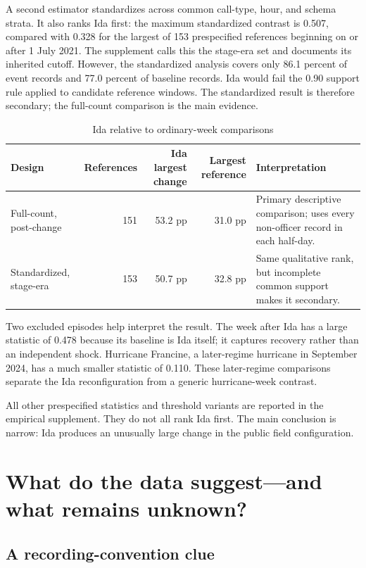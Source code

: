 \documentclass[11pt]{article}
\begin{document}
A second estimator standardizes across common call-type, hour, and schema strata. It also ranks Ida first: the maximum standardized contrast is 0.507, compared with 0.328 for the largest of 153 prespecified references beginning on or after 1 July 2021. The supplement calls this the stage-era set and documents its inherited cutoff. However, the standardized analysis covers only 86.1 percent of event records and 77.0 percent of baseline records. Ida would fail the 0.90 support rule applied to candidate reference windows. The standardized result is therefore secondary; the full-count comparison is the main evidence.

\begin{table}[!htbp]
\centering
\caption{Ida relative to ordinary-week comparisons}
\label{tab:comparison}
\begin{tabularx}{\textwidth}{@{}lrrrX@{}}
\toprule
Design & References & Ida largest change & Largest reference & Interpretation \\
\midrule
Full-count, post-change & 151 & 53.2 pp & 31.0 pp &
Primary descriptive comparison; uses every non-officer record in each half-day. \\
Standardized, stage-era & 153 & 50.7 pp & 32.8 pp &
Same qualitative rank, but incomplete common support makes it secondary. \\
\bottomrule
\end{tabularx}
\end{table}

Two excluded episodes help interpret the result. The week after Ida has a large statistic of 0.478 because its baseline is Ida itself; it captures recovery rather than an independent shock. Hurricane Francine, a later-regime hurricane in September 2024, has a much smaller statistic of 0.110. These later-regime comparisons separate the Ida reconfiguration from a generic hurricane-week contrast.

All other prespecified statistics and threshold variants are reported in the empirical supplement. They do not all rank Ida first. The main conclusion is narrow: Ida produces an unusually large change in the public field configuration.

\section{What do the data suggest---and what remains unknown?}

\subsection{A recording-convention clue}
\end{document}
